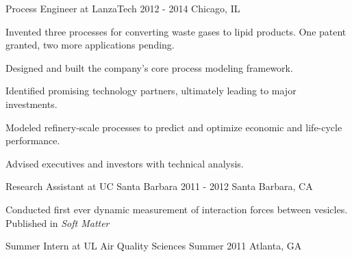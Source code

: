 \begin{cventries}
     
%      
  \cventrynew
    {Process Engineer at LanzaTech} 
    {2012 - 2014} 
    {Chicago, IL} 
    {
      \begin{cvitems} %
        \item {Invented three processes for converting waste gases to lipid products. One patent granted, two more applications pending.}
		\item {Designed and built the company's core process modeling framework.}        
		\item {Identified promising technology partners, ultimately leading to major investments.}
        \item {Modeled refinery-scale processes to predict and optimize economic and life-cycle performance.}        
        \item {Advised executives and investors with technical analysis.}
      \end{cvitems}
    }
    
  \cventryshort
    {Research Assistant at UC Santa Barbara}
    {2011 - 2012}
    {Santa Barbara, CA}         
    {
      \begin{cvitems} %
        \item {Conducted first ever dynamic measurement of interaction forces between vesicles. Published in \emph{Soft Matter}}        
      \end{cvitems}
    }   
  
   \cventryshort
	{Summer Intern at UL Air Quality Sciences}    
    {Summer 2011}
    {Atlanta, GA}
    {}



\end{cventries}
